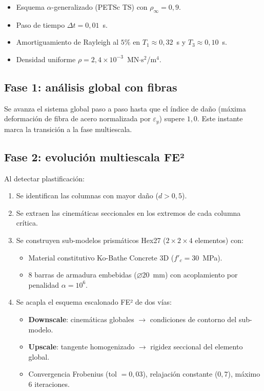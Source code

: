 \begin{itemize}
  \item Esquema $\alpha$-generalizado (PETSc TS) con $\rho_\infty = 0{,}9$.
  \item Paso de tiempo $\Delta t = 0{,}01$~s.
  \item Amortiguamiento de Rayleigh al $5\%$ en $T_1 \approx 0{,}32$~s
        y $T_3 \approx 0{,}10$~s.
  \item Densidad uniforme $\rho = 2{,}4 \times 10^{-3}$~MN$\cdot$s$^2$/m$^4$.
\end{itemize}

\subsection{Fase 1: análisis global con fibras}

Se avanza el sistema global paso a paso hasta que el índice de daño
(máxima deformación de fibra de acero normalizada por $\varepsilon_y$)
supere $1{,}0$.  Este instante marca la transición a la fase multiescala.

\subsection{Fase 2: evolución multiescala FE²}

Al detectar plastificación:
\begin{enumerate}
  \item Se identifican las columnas con mayor daño ($d > 0{,}5$).
  \item Se extraen las cinemáticas seccionales en los extremos de cada
        columna crítica.
  \item Se construyen sub-modelos prismáticos Hex27
        ($2 \times 2 \times 4$ elementos) con:
        \begin{itemize}
          \item Material constitutivo Ko-Bathe Concrete 3D ($f'_c = 30$~MPa).
          \item 8 barras de armadura embebidas ($\varnothing 20$~mm) con
                acoplamiento por penalidad $\alpha = 10^6$.
        \end{itemize}
  \item Se acapla el esquema escalonado FE² de dos vías:
        \begin{itemize}
          \item \textbf{Downscale}: cinemáticas globales $\to$ condiciones de contorno del sub-modelo.
          \item \textbf{Upscale}: tangente homogenizado $\to$ rigidez seccional del elemento global.
          \item Convergencia Frobenius (tol $= 0{,}03$), relajación constante ($0{,}7$), máximo 6 iteraciones.
        \end{itemize}
\end{enumerate}


